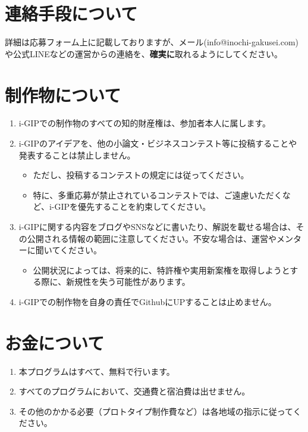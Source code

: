 \documentclass[10.5pt]{jsarticle}
\begin{document}
\section{連絡手段について}
詳細は応募フォーム上に記載しておりますが、メール{(\small info@inochi-gakusei.com)}や公式LINEなどの運営からの連絡を、{\bf 確実に}取れるようにしてください。

\section{制作物について}
\begin{enumerate}
\item i-GIPでの制作物のすべての知的財産権は、参加者本人に属します。
\item i-GIPのアイデアを、他の小論文・ビジネスコンテスト等に投稿することや発表することは禁止しません。
\begin{itemize}
\item[ ] ただし、投稿するコンテストの規定には従ってください。\par
\item[ ] 特に、多重応募が禁止されているコンテストでは、ご遠慮いただくなど、i-GIPを優先することを約束してください。
\end{itemize}
\item i-GIPに関する内容をブログやSNSなどに書いたり、解説を載せる場合は、その公開される情報の範囲に注意してください。不安な場合は、運営やメンターに聞いてください。
\begin{itemize}
\item[ ] 公開状況によっては、将来的に、特許権や実用新案権を取得しようとする際に、新規性を失う可能性があります。
\end{itemize}
\item i-GIPでの制作物を自身の責任でGithubにUPすることは止めません。
\end{enumerate}

\section{お金について}
\begin{enumerate}
\item 本プログラムはすべて、無料で行います。
\item すべてのプログラムにおいて、交通費と宿泊費は出せません。
\item その他のかかる必要{\small （プロトタイプ制作費など）}は各地域の指示に従ってください。
\end{enumerate}
\end{document}
